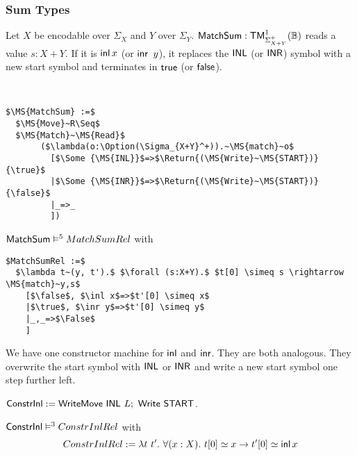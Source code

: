 \subsubsection{Sum Types}
\label{sec:match-sum}

Let $X$ be encodable over $\Sigma_X$ and $Y$ over $\Sigma_Y$.  $\mathsf{MatchSum} : \mathsf{TM}_{\Sigma_{X+Y}^+}^1(\mathbb{B})$ reads a value $s:X+Y$.  If it is
$\operatorname{\mathsf{inl}} x$ (or $\operatorname{\mathsf{inr}}~y$), it replaces the $\mathsf{INL}$ (or $\mathsf{INR}$) symbol with a new start symbol and terminates in $\mathsf{true}$ (or $\mathsf{false}$).

%
\begin{definition}[$\MS{MatchSum}$][MatchSum]
  \label{def:MatchSum}
  ~
  \small
\begin{lstlisting}[style=semicoqstyle]
$\MS{MatchSum} :=$
  $\MS{Move}~R\Seq$
  $\MS{Match}~\MS{Read}$
       ($\lambda(o:\Option(\Sigma_{X+Y}^+)).~\MS{match}~o$
         [$\Some {\MS{INL}}$=>$\Return{(\MS{Write}~\MS{START})}{\true}$
         |$\Some {\MS{INR}}$=>$\Return{(\MS{Write}~\MS{START})}{\false}$
         |_=>_
         ])
\end{lstlisting}
\end{definition}

\begin{lemma}
  \label{lem:MatchSum_Realise}
  $\mathsf{MatchSum} \mathrel{\vDash^{5}} MatchSumRel$ with
\begin{lstlisting}[style=semicoqstyle]
$MatchSumRel :=$
  $\lambda t~(y, t').$ $\forall (s:X+Y).$ $t[0] \simeq s \rightarrow \MS{match}~y,s$
    [$\false$, $\inl x$=>$t'[0] \simeq x$
    |$\true$, $\inr y$=>$t'[0] \simeq y$
    |_,_=>$\False$
    ]
\end{lstlisting}
\end{lemma}

We have one constructor machine for $\operatorname{\mathsf{inl}}$ and $\operatorname{\mathsf{inr}}$.  They are both analogous.  They overwrite the start symbol with $\mathsf{INL}$ or $\mathsf{INR}$ and
write a new start symbol one step further left.
\begin{definition}
  \label{def:Constr_inl}
  $\mathsf{ConstrInl} := \mathsf{WriteMove}~\mathsf{INL}~L ;~ \mathsf{Write}~\mathsf{START}$.
\end{definition}
\begin{lemma}
  \label{lem:Constr_inl_Sem}
  $\mathsf{ConstrInl} \mathrel{\vDash^{3}} ConstrInlRel$ with
  \[
    ConstrInlRel := \lambda t~t'.~\forall(x:X).~t[0] \simeq x \rightarrow t'[0] \simeq \operatorname{\mathsf{inl}} x
  \]
\end{lemma}

